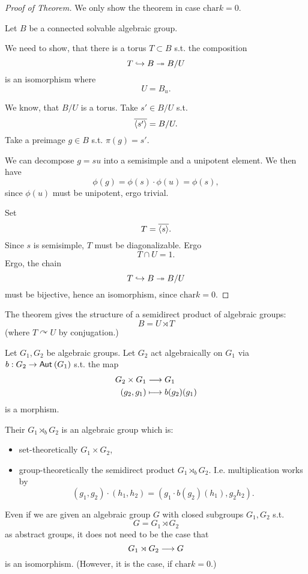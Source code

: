 \begin{proof}[Proof of Theorem]
	We only show the theorem in case $\mathrm{char} k = 0$.
	
	Let $B$ be a connected solvable algebraic group.
	
	We need to show, that there is a torus $T \subset B$ s.t. the composition
	\[ T \overset{}{\hookrightarrow} B \overset{}{\twoheadrightarrow} B/U \]
	is an isomorphism where
	\[ U = B_u. \]
	
	We know, that $B/U$ is a torus. Take $s' \in B/U$ s.t.
	\[ \overline{\left<s'\right>} = B / U. \]
	Take a preimage $g \in B$ s.t. $\pi(g) = s'$.
	
	We can decompose $g=su$ into a semisimple and a unipotent element. We then have
	\[ \phi(g) = \phi(s) \cdot \phi(u) = \phi(s), \]
	since $\phi(u)$ must be unipotent, ergo trivial.
	
	Set
	\[ T= \overline{\left<s\right>}. \]
	Since $s$ is semisimple, $T$ must be diagonalizable. Ergo
	\[ T\cap U = 1. \]
	Ergo, the chain
	\[ T \overset{}{\hookrightarrow} B \overset{}{\twoheadrightarrow} B/U \]
	must be bijective, hence an isomorphism, since $\mathrm{char} k = 0$.
\end{proof}
The theorem gives the structure of a semidirect product of algebraic groups:
\[ B = U \rtimes T \]
(where $T \curvearrowright U$ by conjugation.)

\begin{definition}
	Let $G_1, G_2$ be algebraic groups. Let $G_2$ act algebraically on $G_1$ via $b : G_2 \overset{}{\rightarrow} \textsf{Aut}_{}\left(G_1\right)$ s.t. the map
	\begin{align*}
	G_2 \times G_1 &\overset{}{\longrightarrow} G_1\\
	(g_2,g_1) & \longmapsto b(g_2)(g_1)
	\end{align*}
	is a morphism.
	
	Their  $G_1 \rtimes_b G_2$ is an algebraic group which is:
	\begin{itemize}
		\item set-theoretically $G_1 \times G_2$,
		\item group-theoretically the semidirect product $G_1 \rtimes_b G_2$. I.e. multiplication works by
		\[ (g_1,g_2) \cdot (h_1, h_2) = (g_1 \cdot b(g_2)(h_1), g_2 h_2 ). \]
	\end{itemize}
\end{definition}
\begin{remark}
	Even if we are given an algebraic group $G$ with closed subgroups $G_1, G_2$ s.t.
	\[ G = G_1 \rtimes G_2 \]
	 as abstract groups, it does not need to be the case that
	 \[ G_1 \rtimes G_2 \overset{}{\longrightarrow} G \]
	 is an isomorphism.
	 (However, it is the case, if $\mathrm{char} k = 0$.)
\end{remark}

